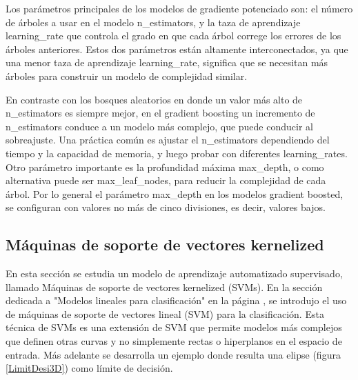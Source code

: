 {%

Los parámetros principales de los modelos de gradiente potenciado  son:  el número de árboles a usar en el modelo  {\ttfamily n\_estimators},  y  la taza de aprendizaje {\ttfamily learning\_rate} que controla el  grado en que  cada árbol correge los errores de los árboles anteriores.  Estos dos parámetros están altamente interconectados, ya que una  menor taza de aprendizaje {\ttfamily learning\_rate},  significa que se necesitan más árboles para construir un modelo de  complejidad similar. 

En contraste con los bosques aleatorios en donde un valor más alto  de \: {\ttfamily n\_estimators} es siempre mejor,  en el gradient boosting  un incremento de {\ttfamily n\_estimators} conduce a un modelo más complejo,  que puede conducir al sobreajuste. Una práctica común es ajustar el {\ttfamily n\_estimators}  dependiendo del   tiempo y la capacidad de memoria, y luego probar con diferentes  {\ttfamily learning\_rates}. \\	


Otro parámetro importante es la profundidad máxima  {\ttfamily max\_depth}, o como alternativa puede ser {\ttfamily max\_leaf\_nodes},  para reducir la  complejidad de cada árbol. Por lo general el parámetro {\ttfamily max\_depth} en los  modelos  gradient boosted,  se configuran con valores no más de cinco divisiones, es decir, valores bajos. \\
 
 

\subsection{Máquinas de soporte de vectores kernelized}\label{kenrelpag}


En  esta sección se estudia un modelo de aprendizaje  automatizado  supervisado,  llamado  Máquinas de soporte de vectores kernelized  (SVMs).  En la sección  dedicada a "{}Modelos lineales para clasificación"{}  en la página \pageref{Mlineales},  se introdujo el uso de máquinas de soporte de vectores  lineal (SVM) para la clasificación. Esta técnica de SVMs   es una extensión de SVM que permite modelos más complejos que definen otras curvas y no  simplemente rectas o hiperplanos  en el espacio de entrada. Más adelante se desarrolla un ejemplo donde resulta una elipse (figura \ref{LimitDesi3D}) como límite de decisión. 

}

